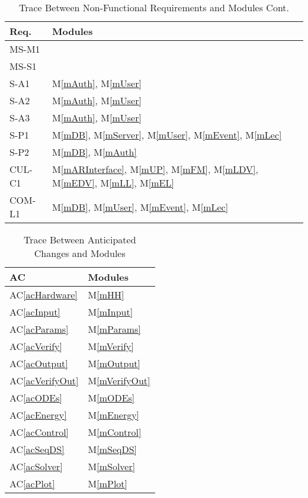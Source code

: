 \documentclass[12pt, titlepage]{article}
\newcommand{\acref}[1]{AC\ref{#1}}
\newcommand{\mref}[1]{M\ref{#1}}
\begin{document}
\begin{table}[H]
\centering
\begin{tabular}{p{} p{}}
\toprule
\textbf{Req.} & \textbf{Modules}\\
\midrule
MS-M1 & \\
MS-S1 & \\
S-A1 & \mref{mAuth}, \mref{mUser}\\
S-A2 & \mref{mAuth}, \mref{mUser}\\
S-A3 & \mref{mAuth}, \mref{mUser}\\
S-P1 & \mref{mDB}, \mref{mServer}, \mref{mUser}, \mref{mEvent}, \mref{mLec}\\
S-P2 & \mref{mDB}, \mref{mAuth}\\
CUL-C1 & \mref{mARInterface}, \mref{mUP}, \mref{mFM}, \mref{mLDV}, \mref{mEDV}, \mref{mLL}, \mref{mEL}\\
COM-L1 & \mref{mDB}, \mref{mUser}, \mref{mEvent}, \mref{mLec}\\
\bottomrule
\end{tabular}
\caption{Trace Between Non-Functional Requirements and Modules Cont.}
\label{TblNFRT-CONT}
\end{table}

\begin{table}[H]
\centering
\begin{tabular}{p{} p{}}
\toprule
\textbf{AC} & \textbf{Modules}\\
\midrule
\acref{acHardware} & \mref{mHH}\\
\acref{acInput} & \mref{mInput}\\
\acref{acParams} & \mref{mParams}\\
\acref{acVerify} & \mref{mVerify}\\
\acref{acOutput} & \mref{mOutput}\\
\acref{acVerifyOut} & \mref{mVerifyOut}\\
\acref{acODEs} & \mref{mODEs}\\
\acref{acEnergy} & \mref{mEnergy}\\
\acref{acControl} & \mref{mControl}\\
\acref{acSeqDS} & \mref{mSeqDS}\\
\acref{acSolver} & \mref{mSolver}\\
\acref{acPlot} & \mref{mPlot}\\
\bottomrule
\end{tabular}
\caption{Trace Between Anticipated Changes and Modules}
\label{TblACT}
\end{table}
\end{document}
